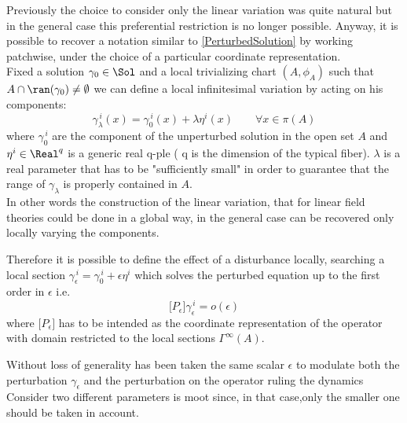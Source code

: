 \documentclass[Main]{subfiles}
\begin{document}
		Previously the choice to consider only the linear variation was quite natural but in the general case this preferential restriction is no longer possible.
		Anyway, it is possible to  recover a notation similar to \ref{PerturbedSolution} by working patchwise, under the choice of a particular coordinate representation.
		\\
		Fixed a solution $\gamma_0 \in \Sol$ and a local trivializing chart $(A, \phi_A)$ such that $A\cap \ran(\gamma_0) \neq \emptyset$ we can define a local infinitesimal variation by acting on his components:
		\begin{displaymath}
			\gamma_\lambda ^{\, i}(x) = \gamma_0^{\, i}(x) + \lambda \eta^i(x) \qquad \forall x\in \pi(A)
		\end{displaymath}
		where $ \gamma_0^{\, i}$ are the component of the unperturbed solution in the open set $A$ and $\eta^i\in \Real^q$ is a generic real q-ple ( q is the dimension of the typical fiber).
		$\lambda$ is a real parameter that has to be "sufficiently small" in order to guarantee that the range of $\gamma_\lambda$ is properly contained in $A$.
		\\
		In other words the construction of the linear variation, that for linear field theories could be done in a global way, in the general case can be recovered only locally varying the components.
		
		Therefore it is possible to define the effect of a disturbance locally, searching a local section $\gamma_\epsilon^{\, i} = \gamma_0^{\, i} + \epsilon \eta^{i}$ which solves  the perturbed equation up to the first order in $\epsilon$ i.e. 
		\begin{displaymath}
			\big[ P_\epsilon \big] \gamma_\epsilon^{\,i} = o(\epsilon)
		\end{displaymath}
		where $\big[ P_\epsilon \big] $ has to be intended as the coordinate representation of the operator with domain restricted to the local sections $\Gamma^\infty(A)$.
		
		\vspace{2mm}
		Without loss of generality has been taken the same scalar $\epsilon$  to modulate both the perturbation $\gamma_\epsilon$ and the %
		perturbation on the operator ruling the dynamics
		\\	
		Consider two different parameters is moot since, in that case,only the smaller one should be taken in account.
\end{document}
